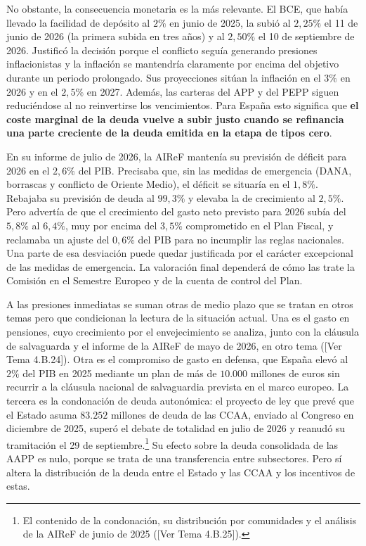 \documentclass[10pt,a4paper]{article}
\newcommand{\authorfont}[1]{{\fontfamily{EBGaramond-TLF}\selectfont #1}}
\begin{document}
No obstante, la consecuencia monetaria es la más relevante. El BCE, que había llevado la facilidad de depósito al $2\%$ en junio de 2025, la subió al $2,25\%$ el 11 de junio de 2026 (la primera subida en tres años) y al $2,50\%$ el 10 de septiembre de 2026. Justificó la decisión porque el conflicto seguía generando presiones inflacionistas y la inflación se mantendría claramente por encima del objetivo durante un periodo prolongado. Sus proyecciones sitúan la inflación en el $3\%$ en 2026 y en el $2,5\%$ en 2027. Además, las carteras del APP y del PEPP siguen reduciéndose al no reinvertirse los vencimientos. Para España esto significa que \textbf{el coste marginal de la deuda vuelve a subir justo cuando se refinancia una parte creciente de la deuda emitida en la etapa de tipos cero}.

En su informe de julio de 2026, la AIReF mantenía su previsión de déficit para 2026 en el $2,6\%$ del PIB. Precisaba que, sin las medidas de emergencia (DANA, borrascas y conflicto de Oriente Medio), el déficit se situaría en el $1,8\%$. Rebajaba su previsión de deuda al $99,3\%$ y elevaba la de crecimiento al $2,5\%$. Pero advertía de que el crecimiento del gasto neto previsto para 2026 subía del $5,8\%$ al $6,4\%$, muy por encima del $3,5\%$ comprometido en el Plan Fiscal, y reclamaba un ajuste del $0,6\%$ del PIB para no incumplir las reglas nacionales. Una parte de esa desviación puede quedar justificada por el carácter excepcional de las medidas de emergencia. La valoración final dependerá de cómo las trate la Comisión en el Semestre Europeo y de la cuenta de control del Plan.

A las presiones inmediatas se suman otras de medio plazo que se tratan en otros temas pero que condicionan la lectura de la situación actual. Una es el gasto en pensiones, cuyo crecimiento por el envejecimiento se analiza, junto con la cláusula de salvaguarda y el informe de la AIReF de mayo de 2026, en otro tema ([\authorfont{Ver Tema 4.B.24}]). Otra es el compromiso de gasto en defensa, que España elevó al $2\%$ del PIB en 2025 mediante un plan de más de $10.000$ millones de euros sin recurrir a la cláusula nacional de salvaguardia prevista en el marco europeo. La tercera es la condonación de deuda autonómica: el proyecto de ley que prevé que el Estado asuma $83.252$ millones de deuda de las CCAA, enviado al Congreso en diciembre de 2025, superó el debate de totalidad en julio de 2026 y reanudó su tramitación el 29 de septiembre.\footnote{El contenido de la condonación, su distribución por comunidades y el análisis de la AIReF de junio de 2025 ([\authorfont{Ver Tema 4.B.25}]).
} Su efecto sobre la deuda consolidada de las AAPP es nulo, porque se trata de una transferencia entre subsectores. Pero sí altera la distribución de la deuda entre el Estado y las CCAA y los incentivos de estas.
\end{document}

